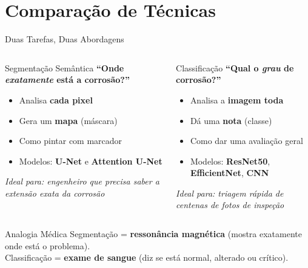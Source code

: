\documentclass[aspectratio=169, 12pt]{beamer}
\begin{document}
\section{Comparação de Técnicas}

\begin{frame}{Duas Tarefas, Duas Abordagens}
    \begin{columns}[T]
        \begin{block}{\faSearchPlus\hspace{0.2cm} Segmentação Semântica}
            \textbf{``Onde \textit{exatamente} está a corrosão?''}
            \begin{itemize}
                \item Analisa \textbf{cada pixel}
                \item Gera um \textbf{mapa} (máscara)
                \item Como pintar com marcador
                \item Modelos: \textbf{U-Net} e \textbf{Attention U-Net}
            \end{itemize}

            \vspace{0.2cm}
            {\footnotesize \textit{Ideal para: engenheiro que precisa saber a extensão exata da corrosão}}
        \end{block}

        \begin{block}{\faTachometerAlt\hspace{0.2cm} Classificação}
            \textbf{``Qual o \textit{grau} de corrosão?''}
            \begin{itemize}
                \item Analisa a \textbf{imagem toda}
                \item Dá uma \textbf{nota} (classe)
                \item Como dar uma avaliação geral
                \item Modelos: \textbf{ResNet50}, \textbf{EfficientNet}, \textbf{CNN}
            \end{itemize}

            \vspace{0.2cm}
            {\footnotesize \textit{Ideal para: triagem rápida de centenas de fotos de inspeção}}
        \end{block}
    \end{columns}

    \vspace{0.5cm}

    \begin{exampleblock}{Analogia Médica}
        Segmentação = \textbf{ressonância magnética} (mostra exatamente onde está o problema).\\
        Classificação = \textbf{exame de sangue} (diz se está normal, alterado ou crítico).
    \end{exampleblock}
\end{frame}
\end{document}
